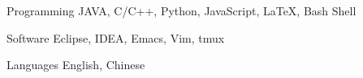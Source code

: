 

\begin{cvskills}

  \cvskill
    {Programming} %
    {JAVA, C/C++, Python, JavaScript, LaTeX, Bash Shell} %

  \cvskill
    {Software} %
    {Eclipse, IDEA, Emacs, Vim, tmux} %

  \cvskill
    {Languages} %
    {English, Chinese} %

\end{cvskills}
